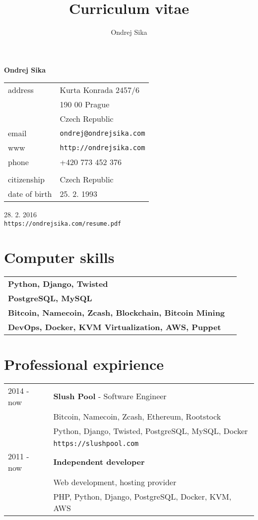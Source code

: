 \documentclass[12pt,a4paper]{article}
\title{Curriculum vitae}
\author{Ondrej Sika}
\begin{document}
\begin{center}
{\LARGE \bf Ondrej Sika}\\
\vspace*{0.2cm}
\begin{tabular}{R{5cm}L{5cm}}
address & Kurta Konrada 2457/6\\
 & 190 00 Prague\\
 & Czech Republic\\
email & \texttt{ondrej@ondrejsika.com}\\
www & \texttt{http://ondrejsika.com}\\
phone & +420 773 452 376\\
\\
citizenship & Czech Republic\\
date of birth & 25. 2. 1993\\
\end{tabular}

\vspace*{0.3cm}
{\hfill 28. 2. 2016}\\
{\hfill \texttt{https://ondrejsika.com/resume.pdf}}
\end{center}

\section*{Computer skills}
\begin{tabular}{@{}ll}
{\bf Python, Django, Twisted} & \\
{\bf PostgreSQL, MySQL} & \\
{\bf Bitcoin, Namecoin, Zcash, Blockchain, Bitcoin Mining} & \\
{\bf DevOps, Docker, KVM Virtualization, AWS, Puppet} & \\
\end{tabular}

\section*{Professional expirience}
\begin{tabular}{@{}p{2cm}l}
2014 - now & {\bf Slush Pool} - Software Engineer\\
 & Bitcoin, Namecoin, Zcash, Ethereum, Rootstock\\
 & Python, Django, Twisted, PostgreSQL, MySQL, Docker\\
 & \texttt{https://slushpool.com}\\
2011 - now & {\bf Independent developer}\\
    & Web development, hosting provider\\
    & PHP, Python, Django, PostgreSQL, Docker, KVM, AWS\\
\end{tabular}
\end{document}
